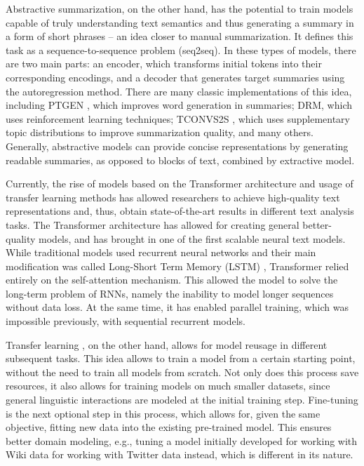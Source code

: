 Abstractive summarization, on the other hand, has the potential to train models capable of truly understanding text semantics and thus generating a summary in a form of short phrases -- an idea closer to manual summarization. It defines this task as a sequence-to-sequence problem (seq2seq). In these types of models, there are two main parts: an encoder, which transforms initial tokens into their corresponding encodings, and a decoder that generates target summaries using the autoregression method. There are many classic implementations of this idea, including PTGEN \cite{SeeLiuManning}, which improves word generation in summaries; DRM, which uses reinforcement learning techniques; TCONVS2S \cite{NarayanCohenLapata}, which uses supplementary topic distributions to improve summarization quality, and many others. Generally, abstractive models can provide concise representations by generating readable summaries, as opposed to blocks of text, combined by extractive model.

Currently, the rise of models based on the Transformer architecture and usage of transfer learning methods has allowed researchers to achieve high-quality text representations and, thus, obtain state-of-the-art results in different text analysis tasks. The Transformer architecture has allowed for creating general better-quality models, and has brought in one of the first scalable neural text models. While traditional models used recurrent neural networks and their main modification was called Long-Short Term Memory (LSTM) \cite{ChengDongLapata}, Transformer \cite{VaswaniShazeerParmar} relied entirely on the self-attention mechanism. This allowed the model to solve the long-term problem of RNNs, namely the inability to model longer sequences without data loss. At the same time, it has enabled parallel training, which was impossible previously, with sequential recurrent models.

Transfer learning \cite{ZhuangQi}, on the other hand, allows for model reusage in different subsequent tasks. This idea allows to train a model from a certain starting point, without the need to train all models from scratch. Not only does this process save resources, it also allows for training models on much smaller datasets, since general linguistic interactions are modeled at the initial training step. Fine-tuning is the next optional step in this process, which allows for, given the same objective, fitting new data into the existing pre-trained model. This ensures better domain modeling, e.g., tuning a model initially developed for working with Wiki data for working with Twitter data instead, which is different in its nature.

